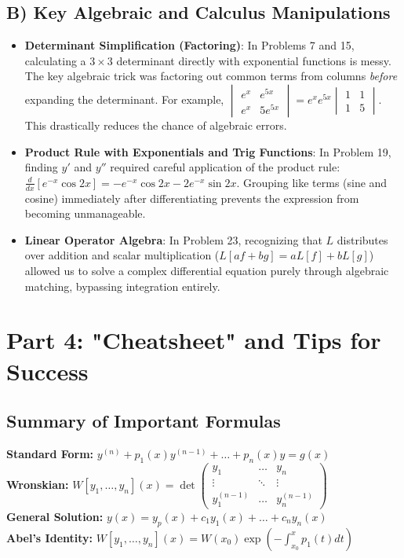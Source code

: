 \documentclass[11pt,letterpaper]{article}
\begin{document}
\subsection{B) Key Algebraic and Calculus Manipulations}
\begin{itemize}
    \item \textbf{Determinant Simplification (Factoring)}: In Problems 7 and 15, calculating a $3 \times 3$ determinant directly with exponential functions is messy. The key algebraic trick was factoring out common terms from columns \textit{before} expanding the determinant. For example, $\begin{vmatrix} e^x & e^{5x} \\ e^x & 5e^{5x} \end{vmatrix} = e^x e^{5x} \begin{vmatrix} 1 & 1 \\ 1 & 5 \end{vmatrix}$. This drastically reduces the chance of algebraic errors.
    \item \textbf{Product Rule with Exponentials and Trig Functions}: In Problem 19, finding $y'$ and $y''$ required careful application of the product rule: $\frac{d}{dx}[e^{-x}\cos 2x] = -e^{-x}\cos 2x - 2e^{-x}\sin 2x$. Grouping like terms (sine and cosine) immediately after differentiating prevents the expression from becoming unmanageable.
    \item \textbf{Linear Operator Algebra}: In Problem 23, recognizing that $L$ distributes over addition and scalar multiplication ($L[af + bg] = aL[f] + bL[g]$) allowed us to solve a complex differential equation purely through algebraic matching, bypassing integration entirely.
\end{itemize}

\newpage
\section{Part 4: "Cheatsheet" and Tips for Success}

\subsection{Summary of Important Formulas}
\begin{mdframed}[backgroundcolor=gray!10]
\textbf{Standard Form:} $y^{(n)} + p_1(x)y^{(n-1)} + \dots + p_n(x)y = g(x)$ \\
\textbf{Wronskian:} $W[y_1, \dots, y_n](x) = \det \begin{pmatrix} y_1 & \dots & y_n \\ \vdots & \ddots & \vdots \\ y_1^{(n-1)} & \dots & y_n^{(n-1)} \end{pmatrix}$ \\
\textbf{General Solution:} $y(x) = y_p(x) + c_1 y_1(x) + \dots + c_n y_n(x)$ \\
\textbf{Abel's Identity:} $W[y_1, \dots, y_n](x) = W(x_0) \exp\left( -\int_{x_0}^x p_1(t) dt \right)$
\end{mdframed}
\end{document}
